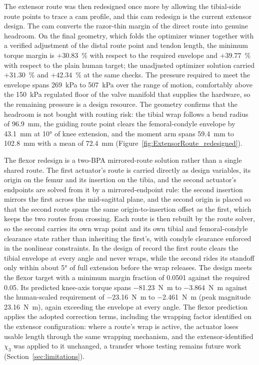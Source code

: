 \documentclass[utf8]{FrontiersinHarvard} %
\begin{document}
The extensor route was then redesigned once more by allowing the tibial-side route points to trace a cam profile, and this cam redesign is the current extensor design. The cam converts the razor-thin margin of the direct route into genuine headroom. On the final geometry, which folds the optimizer winner together with a verified adjustment of the distal route point and tendon length, the minimum torque margin is $+30.83$~\% with respect to the required envelope and $+39.77$~\% with respect to the plain human target; the unadjusted optimizer solution carried $+31.30$~\% and $+42.34$~\% at the same checks. The pressure required to meet the envelope spans \qty{269}{\kPa} to \qty{507}{\kPa} over the range of motion, comfortably above the \qty{150}{\kPa} regulated floor of the valve manifold that supplies the hardware, so the remaining pressure is a design resource. The geometry confirms that the headroom is not bought with routing risk: the tibial wrap follows a bend radius of \qty{96.9}{\mm}, the guiding route point clears the femoral-condyle envelope by \qty{43.1}{\mm} at \ang{10} of knee extension, and the moment arm spans \qty{59.4}{\mm} to \qty{102.8}{\mm} with a mean of \qty{72.4}{\mm} (Figure~\ref{fig:ExtensorRoute_redesigned}).

The flexor redesign is a two-BPA mirrored-route solution rather than a single shared route. The first actuator's route is carried directly as design variables, its origin on the femur and its insertion on the tibia, and the second actuator's endpoints are solved from it by a mirrored-endpoint rule: the second insertion mirrors the first across the mid-sagittal plane, and the second origin is placed so that the second route spans the same origin-to-insertion offset as the first, which keeps the two routes from crossing. Each route is then rebuilt by the route solver, so the second carries its own wrap point and its own tibial and femoral-condyle clearance state rather than inheriting the first's, with condyle clearance enforced in the nonlinear constraints. In the design of record the first route clears the tibial envelope at every angle and never wraps, while the second rides its standoff only within about \ang{5} of full extension before the wrap releases. The design meets the flexor target with a minimum margin fraction of 0.0501 against the required 0.05. Its predicted knee-axis torque spans \qty{-81.23}{\newton\meter} to \qty{-3.864}{\newton\meter} against the human-scaled requirement of \qty{-23.16}{\newton\meter} to \qty{-2.461}{\newton\meter} (peak magnitude \qty{23.16}{\newton\meter}), again exceeding the envelope at every angle. The flexor prediction applies the adopted correction terms, including the wrapping factor identified on the extensor configuration: where a route's wrap is active, the actuator loses usable length through the same wrapping mechanism, and the extensor-identified $\chi_{3}$ was applied to it unchanged, a transfer whose testing remains future work (Section~\ref{sec:limitations}).
\end{document}
